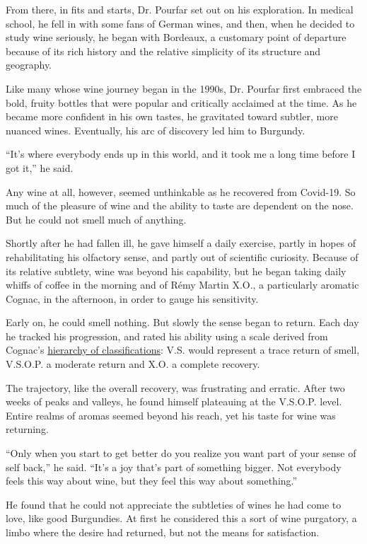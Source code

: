 From there, in fits and starts, Dr. Pourfar set out on his exploration.
In medical school, he fell in with some fans of German wines, and then,
when he decided to study wine seriously, he began with Bordeaux, a
customary point of departure because of its rich history and the
relative simplicity of its structure and geography.

Like many whose wine journey began in the 1990s, Dr. Pourfar first
embraced the bold, fruity bottles that were popular and critically
acclaimed at the time. As he became more confident in his own tastes, he
gravitated toward subtler, more nuanced wines. Eventually, his arc of
discovery led him to Burgundy.

``It's where everybody ends up in this world, and it took me a long time
before I got it,'' he said.

Any wine at all, however, seemed unthinkable as he recovered from
Covid-19. So much of the pleasure of wine and the ability to taste are
dependent on the nose. But he could not smell much of anything.

Shortly after he had fallen ill, he gave himself a daily exercise,
partly in hopes of rehabilitating his olfactory sense, and partly out of
scientific curiosity. Because of its relative subtlety, wine was beyond
his capability, but he began taking daily whiffs of coffee in the
morning and of Rémy Martin X.O., a particularly aromatic Cognac, in the
afternoon, in order to gauge his sensitivity.

Early on, he could smell nothing. But slowly the sense began to return.
Each day he tracked his progression, and rated his ability using a scale
derived from Cognac's
\href{https://www.eater.com/drinks/2015/11/17/9747068/what-is-cognac}{hierarchy
of classifications}: V.S. would represent a trace return of smell,
V.S.O.P. a moderate return and X.O. a complete recovery.

The trajectory, like the overall recovery, was frustrating and erratic.
After two weeks of peaks and valleys, he found himself plateauing at the
V.S.O.P. level. Entire realms of aromas seemed beyond his reach, yet his
taste for wine was returning.

``Only when you start to get better do you realize you want part of your
sense of self back,'' he said. ``It's a joy that's part of something
bigger. Not everybody feels this way about wine, but they feel this way
about something.''

He found that he could not appreciate the subtleties of wines he had
come to love, like good Burgundies. At first he considered this a sort
of wine purgatory, a limbo where the desire had returned, but not the
means for satisfaction.


